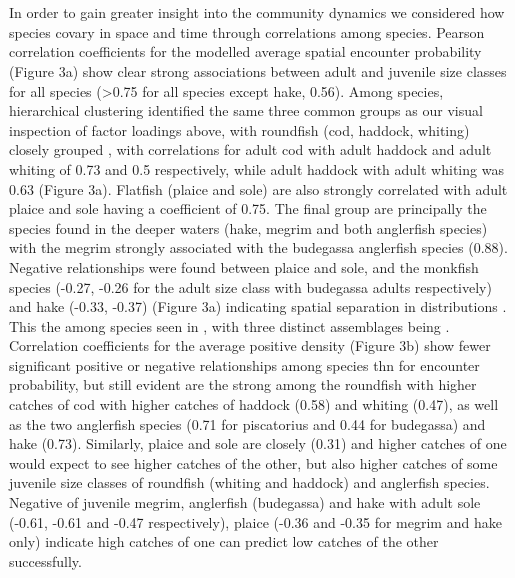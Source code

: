 \documentclass[fleqn,10pt]{wlscirep}
\begin{document}
\begin{linenumbers}
\subsection*{\\} 
In order to gain greater insight into the community dynamics we considered how
species covary in space and time through correlations among species.  Pearson
correlation coefficients for the modelled average spatial encounter probability
(Figure 3a) show clear strong associations between adult and juvenile size
classes for all species (\textgreater 0.75 for all species except hake, 0.56).
Among species, hierarchical clustering identified the same three common
groups as our visual inspection of factor loadings
above, with roundfish (cod, haddock, whiting) closely grouped
, with correlations for adult cod with
adult haddock and adult whiting of 0.73 and 0.5 respectively, while adult
haddock with adult whiting was 0.63 (Figure 3a). Flatfish (plaice and sole) are
also strongly correlated with adult plaice and sole having a coefficient of
0.75.  The final group are principally the species found in the deeper waters
(hake, megrim and both anglerfish species) with the megrim strongly associated
with the budegassa anglerfish species (0.88). Negative relationships were found
between plaice and sole, and the monkfish species (-0.27, -0.26 for the adult
size class with budegassa adults respectively) and hake (-0.33, -0.37) (Figure
3a) indicating spatial separation in distributions . This
 the
 among species seen in
 , with three distinct assemblages being
.\\

Correlation coefficients for the average positive density (Figure 3b) show
fewer significant positive or negative relationships among species
thn for encounter probability, but still evident are
the strong  among the roundfish with
higher catches of cod 
 with higher catches of haddock (0.58)
and whiting (0.47), as well as the two anglerfish species (0.71 for piscatorius
and 0.44 for budegassa) and hake (0.73). Similarly, plaice and sole are closely
 (0.31) and higher catches of one would
expect to see higher catches of the other, but also higher catches of some
juvenile size classes of roundfish (whiting and haddock) and anglerfish
species. Negative  of juvenile
megrim, anglerfish (budegassa) and hake with adult sole (-0.61, -0.61 and -0.47
respectively), plaice (-0.36 and -0.35 for megrim and hake only) indicate high
catches of one can predict low catches of the other successfully.\\


\end{linenumbers}
\end{document}
